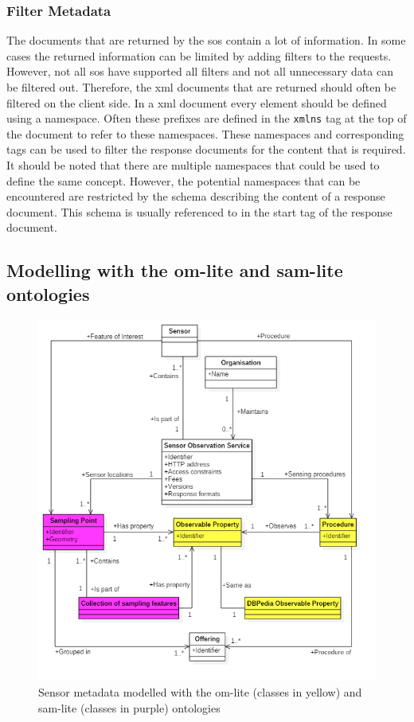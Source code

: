\subsubsection{Filter Metadata}

The documents that are returned by the \ac{sos} contain a lot of information. In some cases the returned information can be limited by adding filters to the requests. However, not all \ac{sos} have supported all filters and not all unnecessary data can be filtered out. Therefore, the \ac{xml} documents that are returned should often be filtered on the client side. In a \ac{xml} document every element should be defined using a namespace. Often these prefixes are defined in the \texttt{xmlns} tag at the top of the document to refer to these namespaces. These namespaces and corresponding tags can be used to filter the response documents for the content that is required. It should be noted that there are multiple namespaces that could be used to define the same concept. However, the potential namespaces that can be encountered are restricted by the schema describing the content of a response document. This schema is usually referenced to in the start tag of the response document.


\subsection{Modelling with the om-lite and sam-lite ontologies}
\begin{figure}
	\centering
	\includegraphics[width=1\linewidth]{UML/SOS_Semantic_UML_2.PNG}
	\caption{Sensor metadata modelled with the om-lite (classes in yellow) and sam-lite (classes in purple) ontologies}
	\label{fig:SOS_Semantic_UML}
\end{figure}


